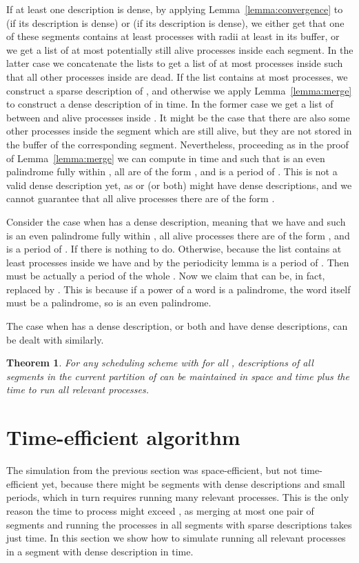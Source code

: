 \documentclass{article}[11pt,letter]
\newtheorem{theorem}[definition]{Theorem}
\begin{document}
If at least one description is dense, by applying Lemma~\ref{lemma:convergence} to  (if its description is dense) or  (if its description is dense), we either get that one of these
segments contains at least  processes with radii at least  in its buffer, or we get a list of at most  potentially still alive processes
inside each segment.
In the latter case we concatenate the lists to get a list of at most  processes inside  such that all other processes
inside are dead. If the list contains at most  processes, we construct a sparse description of , and otherwise we apply Lemma~\ref{lemma:merge} to construct a dense description of  in  time.
In the former case we get a list of between  and  alive processes  inside . It might be the case that 
there are also some other processes inside the segment which are still alive, but they are not stored in the buffer of the corresponding segment. Nevertheless,
proceeding as in the proof of Lemma~\ref{lemma:merge} we can compute in  time  and  such that  is an even
palindrome fully within , all  are of the form , and  is a period of . This is not a valid 
dense description yet, as  or  (or both) might have dense descriptions, and we cannot guarantee that all alive processes 
there are of the form .

Consider the case when  has a dense description, meaning that we have  and  such  is an even palindrome fully within ,
all alive processes there are of the form , and  is a period of . If  there is nothing to do.
Otherwise, because the list  contains at least  processes inside  we have  and
by the periodicity lemma  is a period of . Then  must be actually a period of the whole . 
Now we claim that  can be, in fact, replaced by . This is because if a power of a word is a palindrome, the word itself must be a palindrome,
so  is an even palindrome.

The case when  has a dense description, or both  and  have dense descriptions, can be dealt with similarly.

\begin{theorem}
\label{memory_efficient}
For any scheduling scheme with  for all , descriptions of all segments in the current
partition of  can be maintained in  space and  time plus the
time to run all relevant processes.
\end{theorem}

\section{Time-efficient algorithm}
\label{section:time2}
The simulation from the previous section was space-efficient, but not time-efficient yet, because there might be segments with
dense descriptions and small periods, which in turn requires running many relevant processes. 
This is the only reason the time to process  might exceed , as merging at most one pair of segments and
running the processes in all segments with sparse descriptions takes just  time. In this section we show how to simulate
running all relevant processes in a segment with dense description in  time.
\end{document}
